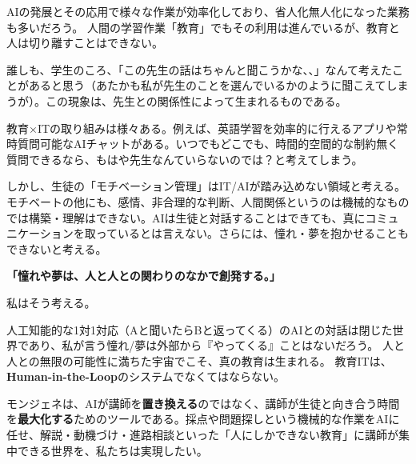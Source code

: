 \documentclass[paper=a4,fontsize=10.5bp,jafontsize=10.5bp,twocolumn]{jlreq}
\begin{document}
AIの発展とその応用で様々な作業が効率化しており、省人化無人化になった業務も多いだろう。
人間の学習作業「教育」でもその利用は進んでいるが、教育と人は切り離すことはできない。

誰しも、学生のころ、「この先生の話はちゃんと聞こうかな、、」なんて考えたことがあると思う（あたかも私が先生のことを選んでいるかのように聞こえてしまうが）。この現象は、先生との関係性によって生まれるものである。

教育×ITの取り組みは様々ある。例えば、英語学習を効率的に行えるアプリや常時質問可能なAIチャットがある。いつでもどこでも、時間的空間的な制約無く質問できるなら、もはや先生なんていらないのでは？と考えてしまう。

しかし、生徒の「モチベーション管理」はIT/AIが踏み込めない領域と考える。モチベートの他にも、感情、非合理的な判断、人間関係というのは機械的なものでは構築・理解はできない。AIは生徒と対話することはできても、真にコミュニケーションを取っているとは言えない。さらには、憧れ・夢を抱かせることもできないと考える。

\begin{highlightbox}
\textbf{「憧れや夢は、人と人との関わりのなかで創発する。」}

私はそう考える。

人工知能的な1対1対応（Aと聞いたらBと返ってくる）のAIとの対話は閉じた世界であり、私が言う憧れ/夢は外部から『やってくる』ことはないだろう。
人と人との無限の可能性に満ちた宇宙でこそ、真の教育は生まれる。
教育ITは、\textbf{Human-in-the-Loop}のシステムでなくてはならない。
\end{highlightbox}

モンジェネは、AIが講師を\textbf{置き換える}のではなく、講師が生徒と向き合う時間を\textbf{最大化する}ためのツールである。採点や問題探しという機械的な作業をAIに任せ、解説・動機づけ・進路相談といった「人にしかできない教育」に講師が集中できる世界を、私たちは実現したい。
\end{document}
